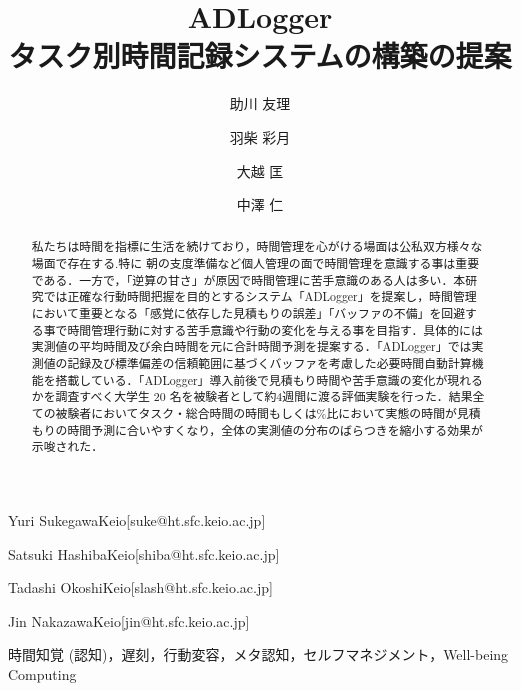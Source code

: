 \documentclass[submit,techrep,noauthor]{ipsj}
\begin{document}
\title{ADLogger\\
タスク別時間記録システムの構築の提案}



\author{助川 友理}{Yuri Sukegawa}{Keio}[suke@ht.sfc.keio.ac.jp]
\author{羽柴 彩月}{Satsuki Hashiba}{Keio}[shiba@ht.sfc.keio.ac.jp]
\author{大越 匡}{Tadashi Okoshi}{Keio}[slash@ht.sfc.keio.ac.jp]
\author{中澤 仁}{Jin Nakazawa}{Keio}[jin@ht.sfc.keio.ac.jp]

\begin{abstract}
私たちは時間を指標に生活を続けており，時間管理を心がける場面は公私双方様々な場面で存在する.特に 朝の支度準備など個人管理の面で時間管理を意識する事は重要である．一方で，「逆算の甘さ」が原因で時間管理に苦手意識のある人は多い．本研究では正確な行動時間把握を目的とするシステム「ADLogger」を提案し，時間管理において重要となる「感覚に依存した見積もりの誤差」「バッファの不備」を回避する事で時間管理行動に対する苦手意識や行動の変化を与える事を目指す．具体的には実測値の平均時間及び余白時間を元に合計時間予測を提案する．「ADLogger」では実測値の記録及び標準偏差の信頼範囲に基づくバッファを考慮した必要時間自動計算機能を搭載している．「ADLogger」導入前後で見積もり時間や苦手意識の変化が現れるかを調査すべく大学生 20 名を被験者として約4週間に渡る評価実験を行った．結果全ての被験者においてタスク・総合時間の時間もしくは\%比において実態の時間が見積もりの時間予測に合いやすくなり，全体の実測値の分布のばらつきを縮小する効果が示唆された．
\end{abstract}


\begin{jkeyword}
時間知覚 (認知)，遅刻，行動変容，メタ認知，セルフマネジメント，Well-being Computing
\end{jkeyword}
\end{document}
